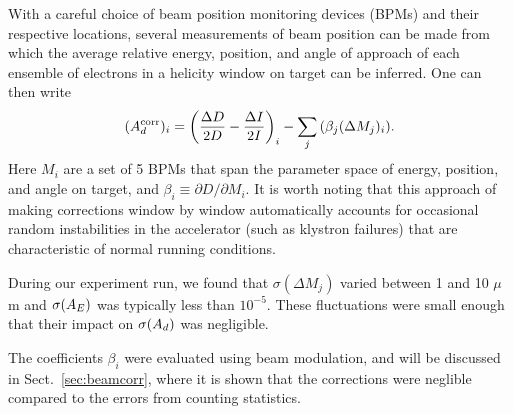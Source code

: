 With a careful choice of beam position monitoring devices (BPMs) 
and their respective locations, several measurements of beam
position can be made from which the average relative energy,
position, and angle of approach of each ensemble of electrons in a
helicity window on target can be inferred. One can then write
\begin{equation} 
(A^{\rm corr}_d)_i = \left(\frac{\Delta D}{2D} - \frac{\Delta I}{2I}\right)_i
-\sum_j{\left({\beta_j(\Delta M_j)_i}\right)}.
\end{equation}
Here $M_i$ are a set of 5 BPMs that span the parameter space of
energy, position, and angle on target, and $\beta_i \equiv \partial
D/\partial M_i$. It is worth noting that this approach of making
corrections window by window automatically accounts for occasional
random instabilities in the accelerator (such as klystron
failures) that are characteristic of normal running conditions.

During our experiment run, we found that $\sigma(\Delta M_j)$ varied
between 1 and 10 $\mu$m and $\sigma (A_E)$ was typically less
than $10^{-5}$. These fluctuations were small enough that their
impact on $\sigma (A_d)$ was negligible. 

The coefficients $\beta_i$ were evaluated using beam modulation, and will be
discussed in Sect.~\ref{sec:beamcorr}, where it is shown that the 
corrections were neglible compared to the errors from counting statistics.




